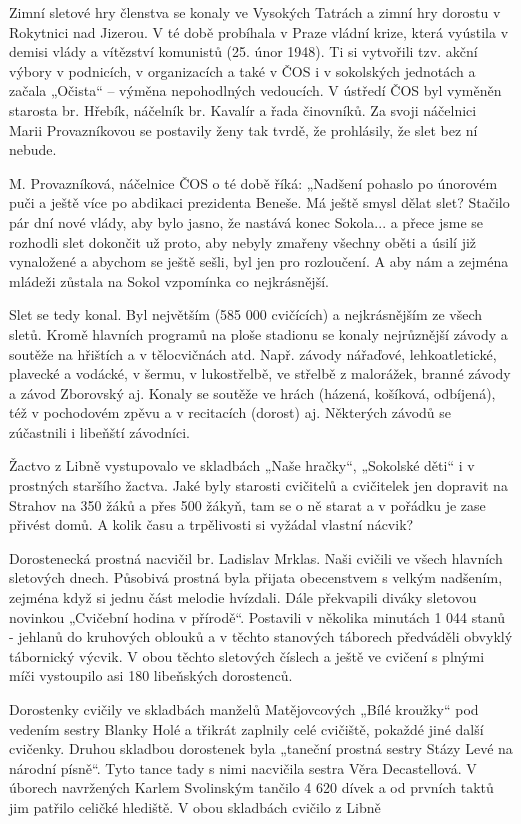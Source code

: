 Zimní sletové hry členstva se konaly ve Vysokých Tatrách a zimní hry
dorostu v Rokytnici nad Jizerou. V té době probíhala v Praze vládní
krize, která vyústila v demisi vlády a vítězství komunistů (25. únor
1948). Ti si vytvořili tzv. akční výbory v podnicích, v organizacích a
také v ČOS i v sokolských jednotách a začala „Očista`` -- výměna
nepohodlných vedoucích. V ústředí ČOS byl vyměněn starosta br. Hřebík,
náčelník br. Kavalír a řada činovníků. Za svoji náčelnici Marii
Provazníkovou se postavily ženy tak tvrdě, že prohlásily, že slet bez ní
nebude.

M. Provazníková, náčelnice ČOS o té době říká: „Nadšení pohaslo po
únorovém puči a ještě více po abdikaci prezidenta Beneše. Má ještě smysl
dělat slet? Stačilo pár dní nové vlády, aby bylo jasno, že nastává konec
Sokola... a přece jsme se rozhodli slet dokončit už proto, aby nebyly
zmařeny všechny oběti a úsilí již vynaložené a abychom se ještě sešli,
byl jen pro rozloučení. A aby nám a zejména mládeži zůstala na Sokol
vzpomínka co nejkrásnější.

Slet se tedy konal. Byl největším (585 000 cvičících) a nejkrásnějším ze
všech sletů. Kromě hlavních programů na ploše stadionu se konaly
nejrůznější závody a soutěže na hřištích a v tělocvičnách atd. Např.
závody nářaďové, lehkoatletické, plavecké a vodácké, v šermu, v
lukostřelbě, ve střelbě z malorážek, branné závody a závod Zborovský aj.
Konaly se soutěže ve hrách (házená, košíková, odbíjená), též v
pochodovém zpěvu a v recitacích (dorost) aj. Některých závodů se
zúčastnili i libeňští závodníci.

Žactvo z Libně vystupovalo ve skladbách „Naše hračky``, „Sokolské děti``
i v prostných staršího žactva. Jaké byly starosti cvičitelů a cvičitelek
jen dopravit na Strahov na 350 žáků a přes 500 žákyň, tam se o ně starat
a v pořádku je zase přivést domů. A kolik času a trpělivosti si vyžádal
vlastní nácvik?

Dorostenecká prostná nacvičil br. Ladislav Mrklas. Naši cvičili ve všech
hlavních sletových dnech. Působivá prostná byla přijata obecenstvem s
velkým nadšením, zejména když si jednu část melodie hvízdali. Dále
překvapili diváky sletovou novinkou „Cvičební hodina v přírodě``.
Postavili v několika minutách 1 044 stanů - jehlanů do kruhových oblouků
a v těchto stanových táborech předváděli obvyklý tábornický výcvik. V
obou těchto sletových číslech a ještě ve cvičení s plnými míči
vystoupilo asi 180 libeňských dorostenců.

Dorostenky cvičily ve skladbách manželů Matějovcových „Bílé kroužky``
pod vedením sestry Blanky Holé a třikrát zaplnily celé cvičiště, pokaždé
jiné další cvičenky. Druhou skladbou dorostenek byla „taneční prostná
sestry Stázy Levé na národní písně``. Tyto tance tady s nimi nacvičila
sestra Věra Decastellová. V úborech navržených Karlem Svolinským tančilo
4 620 dívek a od prvních taktů jim patřilo celičké hlediště. V obou
skladbách cvičilo z Libně

